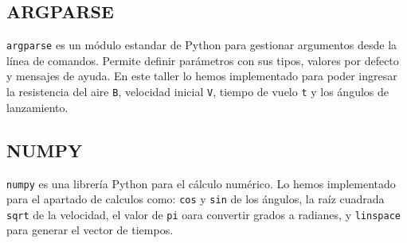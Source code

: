 \documentclass{article}
\begin{document}
\subsection{ARGPARSE}
\label{sec:org2c9ad05}
\texttt{argparse} es un módulo estandar de Python para gestionar argumentos desde
la línea de comandos. Permite definir parámetros con sus tipos, valores
por defecto y mensajes de ayuda. En este taller lo hemos implementado para
poder ingresar la resistencia del aire \texttt{B}, velocidad inicial \texttt{V}, tiempo
de vuelo \texttt{t} y los ángulos de lanzamiento.
\subsection{NUMPY}
\label{sec:orgd2a0e8b}
\texttt{numpy} es una librería Python para el cálculo numérico. Lo hemos implementado
para el apartado de calculos como: \texttt{cos} y \texttt{sin} de los ángulos, la raíz
cuadrada \texttt{sqrt} de la velocidad, el valor de \texttt{pi} oara convertir grados a
radianes, y \texttt{linspace} para generar el vector de tiempos.
\end{document}
